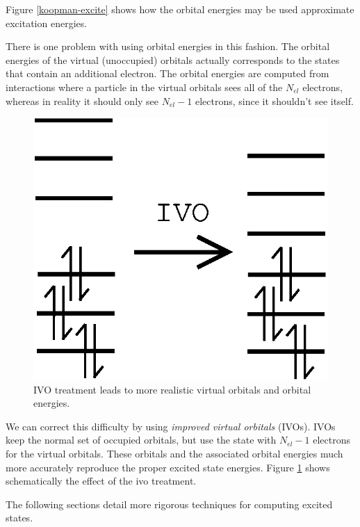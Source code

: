 Figure \ref{koopman-excite} shows how the orbital energies may be used
approximate excitation energies.

There is one problem with using orbital energies in this fashion. The
orbital energies of the virtual (unoccupied) orbitals actually
corresponds to the states that contain an additional electron. The
orbital energies are computed from interactions where a particle in
the virtual orbitals sees all of the $N_{el}$ electrons, whereas in
reality it should only see $N_{el}-1$ electrons, since it shouldn't
see itself.

\begin{figure}
\begin{center}
\includegraphics[scale=0.6]{ivo.eps}
\end{center}
\caption{IVO treatment leads to more realistic virtual orbitals and
orbital energies.}  
\label{ivo}
\end{figure}

We can correct this difficulty by using \emph{improved virtual
orbitals} (IVOs). IVOs keep the normal set of occupied orbitals, but
use the state with $N_{el}-1$ electrons for the virtual
orbitals. These orbitals and the associated orbital energies much more
accurately reproduce the proper excited state energies. Figure
\ref{ivo} shows schematically the effect of the ivo treatment.

The following sections detail more rigorous techniques for computing
excited states.


